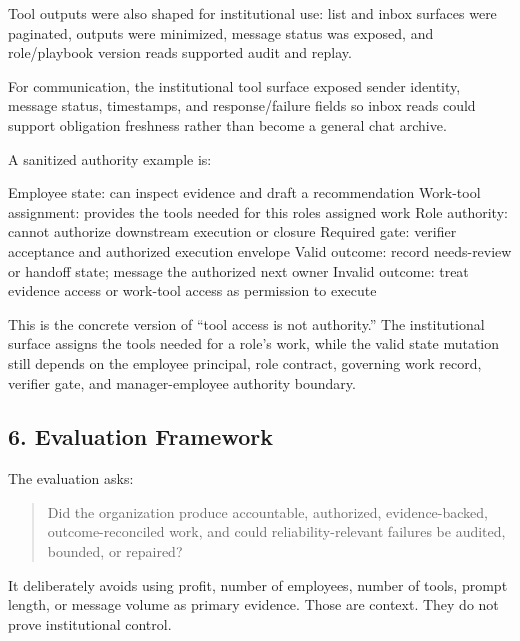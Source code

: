 \documentclass[
]{article}
\newenvironment{Shaded}{}{}
\newcommand{\NormalTok}[1]{#1}
\begin{document}
Tool outputs were also shaped for institutional use: list and inbox surfaces were paginated, outputs were minimized, message status was exposed, and role/playbook version reads supported audit and replay.

For communication, the institutional tool surface exposed sender identity, message status, timestamps, and response/failure fields so inbox reads could support obligation freshness rather than become a general chat archive.

A sanitized authority example is:

\begin{Shaded}
\begin{Highlighting}[]
\NormalTok{Employee state: can inspect evidence and draft a recommendation}
\NormalTok{Work{-}tool assignment: provides the tools needed for this role\textquotesingle{}s assigned work}
\NormalTok{Role authority: cannot authorize downstream execution or closure}
\NormalTok{Required gate: verifier acceptance and authorized execution envelope}
\NormalTok{Valid outcome: record needs{-}review or handoff state; message the authorized next owner}
\NormalTok{Invalid outcome: treat evidence access or work{-}tool access as permission to execute}
\end{Highlighting}
\end{Shaded}

This is the concrete version of ``tool access is not authority.'' The institutional surface assigns the tools needed for a role's work, while the valid state mutation still depends on the employee principal, role contract, governing work record, verifier gate, and manager-employee authority boundary.

\subsection{6. Evaluation Framework}\label{evaluation-framework}

The evaluation asks:

\begin{quote}
Did the organization produce accountable, authorized, evidence-backed, outcome-reconciled work, and could reliability-relevant failures be audited, bounded, or repaired?
\end{quote}

It deliberately avoids using profit, number of employees, number of tools, prompt length, or message volume as primary evidence. Those are context. They do not prove institutional control.
\end{document}
